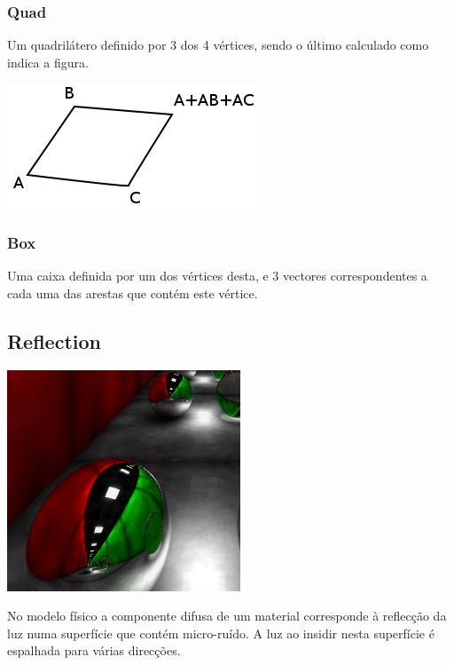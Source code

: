 \documentclass[a4paper]{article}
\begin{document}
\subsubsection{Quad}
\indent \indent Um quadrilátero definido por 3 dos 4 vértices, sendo o último calculado como indica a figura.
\begin{center}
	\includegraphics[scale=0.50]{images/quad.png}
	\label{fig:quad}
\end{center}

\subsubsection{Box}
\indent \indent Uma caixa definida por um dos vértices desta, e 3 vectores correspondentes a cada uma das 
arestas que contém este vértice.

\cleardoublepage
\subsection{Reflection}

\begin{center}
	\includegraphics[scale=0.50]{images/reflection.png}
	\label{fig:reflection}
\end{center}

\indent No modelo físico a componente difusa de um material corresponde à reflecção da luz numa superfície
que contém micro-ruído. A luz ao insidir nesta superfície é espalhada para várias direcções. 
\end{document}
